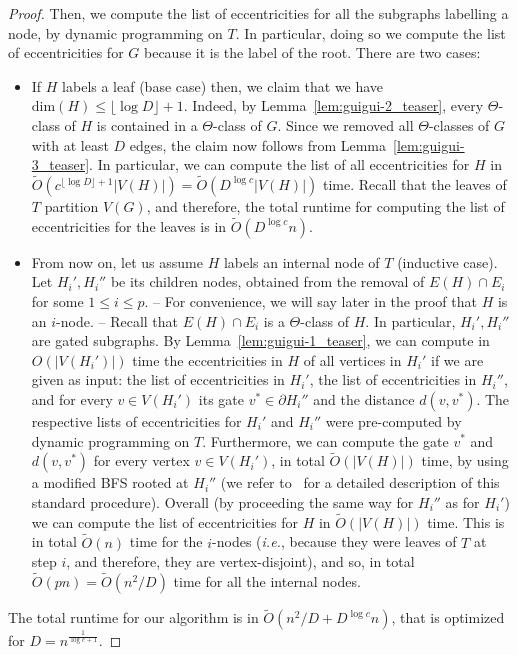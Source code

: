 \documentclass[a4paper,UKenglish,numberwithinsect,cleveref, autoref]{lipics-v2021}
\begin{document}
\begin{proof}
Then, we compute the list of eccentricities for all the subgraphs labelling a node, by dynamic programming on $T$. 
In particular, doing so we compute the list of eccentricities for $G$ because it is the label of the root.
There are two cases:
\begin{itemize}
    \item If $H$ labels a leaf (base case) then, we claim that we have $\mbox{dim}(H) \leq \lfloor \log{D} \rfloor + 1$.
Indeed, by Lemma~\ref{lem:guigui-2_teaser}, every $\Theta$-class of $H$ is contained in a $\Theta$-class of $G$.
Since we removed all $\Theta$-classes of $G$ with at least $D$ edges, the claim now follows from Lemma~\ref{lem:guigui-3_teaser}.
In particular, we can compute the list of all eccentricities for $H$ in $\tilde{O}(c^{\lfloor \log{D} \rfloor + 1}|V(H)|) = \tilde{O}(D^{\log{c}}|V(H)|)$ time.
Recall that the leaves of $T$ partition $V(G)$, and therefore, the total runtime for computing the list of eccentricities for the leaves is in $\tilde{O}(D^{\log{c}}n)$.
    \item From now on, let us assume $H$ labels an internal node of $T$ (inductive case).
Let $H_i',H_i''$ be its children nodes, obtained from the removal of $E(H) \cap E_i$ for some $1 \leq i \leq p$.
-- For convenience, we will say later in the proof that $H$ is an $i$-node. --
Recall that $E(H) \cap E_i$ is a $\Theta$-class of $H$.
In particular, $H_i',H_i''$ are gated subgraphs.
By Lemma~\ref{lem:guigui-1_teaser}, we can compute in ${O}(|V(H_i')|)$ time the eccentricities in $H$ of all vertices in $H_i'$ if we are given as input: the list of eccentricities in $H_i'$, the list of eccentricities in $H_i''$, and for every $v \in V(H_i')$ its gate $v^* \in \partial H_i''$ and the distance $d(v,v^*)$. 
The respective lists of eccentricities for $H_i'$ and $H_i''$ were pre-computed by dynamic programming on $T$.
Furthermore, we can compute the gate $v^*$ and $d(v,v^*)$ for every vertex $v \in V(H_i')$, in total $\tilde{O}(|V(H)|)$ time, by using a modified BFS rooted at $H_i''$ (we refer to~\cite[Lemma 17]{ChLaRa19} for a detailed description of this standard procedure).
Overall (by proceeding the same way for $H_i''$ as for $H_i'$) we can compute the list of eccentricities for $H$ in $\tilde{O}(|V(H)|)$ time.
This is in total $\tilde{O}(n)$ time for the $i$-nodes ({\it i.e.}, because they were leaves of $T$ at step $i$, and therefore, they are vertex-disjoint), and so, in total $\tilde{O}(pn) = \tilde{ O}(n^2/D)$ time for all the internal nodes.
\end{itemize}
The total runtime for our algorithm is in $\tilde{O}(n^2/D + D^{\log{c}}n)$, that is optimized for $D = n^{\frac 1 {\log{c}+1}}$.
\end{proof}
\end{document}
